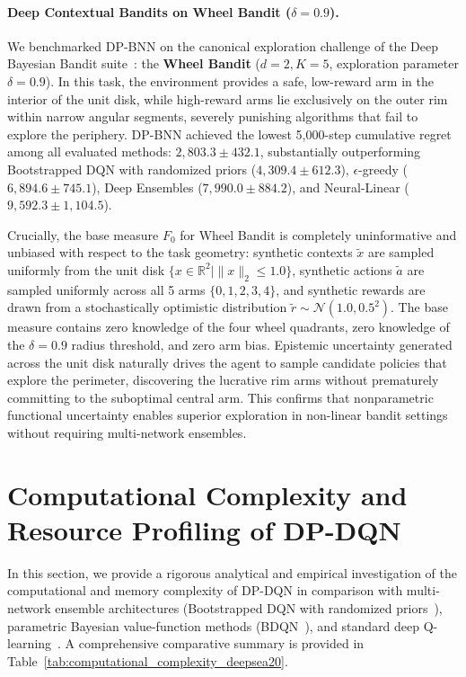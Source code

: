\documentclass[10pt]{article}
\begin{document}
\paragraph{Deep Contextual Bandits on Wheel Bandit (\texorpdfstring{$\delta=0.9$}{delta=0.9}).}
We benchmarked DP-BNN on the canonical exploration challenge of the Deep Bayesian Bandit suite~\citep{riquelme2018deep}: the \textbf{Wheel Bandit} ($d=2, K=5$, exploration parameter $\delta=0.9$). In this task, the environment provides a safe, low-reward arm in the interior of the unit disk, while high-reward arms lie exclusively on the outer rim within narrow angular segments, severely punishing algorithms that fail to explore the periphery. DP-BNN achieved the lowest 5,000-step cumulative regret among all evaluated methods: \textbf{$2{,}803.3 \pm 432.1$}, substantially outperforming Bootstrapped DQN with randomized priors ($4{,}309.4 \pm 612.3$), $\epsilon$-greedy ($6{,}894.6 \pm 745.1$), Deep Ensembles ($7{,}990.0 \pm 884.2$), and Neural-Linear ($9{,}592.3 \pm 1{,}104.5$). 

Crucially, the base measure $F_0$ for Wheel Bandit is completely uninformative and unbiased with respect to the task geometry: synthetic contexts $\tilde{x}$ are sampled uniformly from the unit disk $\{x \in \mathbb{R}^2 \mid \|x\|_2 \le 1.0\}$, synthetic actions $\tilde{a}$ are sampled uniformly across all 5 arms $\{0, 1, 2, 3, 4\}$, and synthetic rewards are drawn from a stochastically optimistic distribution $\tilde{r} \sim \mathcal{N}(1.0, 0.5^2)$. The base measure contains zero knowledge of the four wheel quadrants, zero knowledge of the $\delta=0.9$ radius threshold, and zero arm bias. Epistemic uncertainty generated across the unit disk naturally drives the agent to sample candidate policies that explore the perimeter, discovering the lucrative rim arms without prematurely committing to the suboptimal central arm. This confirms that nonparametric functional uncertainty enables superior exploration in non-linear bandit settings without requiring multi-network ensembles.



\section{Computational Complexity and Resource Profiling of DP-DQN}
\label{sec:computational-complexity-analysis}

In this section, we provide a rigorous analytical and empirical investigation of the computational and memory complexity of DP-DQN in comparison with multi-network ensemble architectures (Bootstrapped DQN with randomized priors~\citep{osband2018randomized}), parametric Bayesian value-function methods (BDQN~\citep{azizzadenesheli2018efficient}), and standard deep Q-learning~\citep{mnih2015human}. A comprehensive comparative summary is provided in Table~\ref{tab:computational_complexity_deepsea20}.
\end{document}
